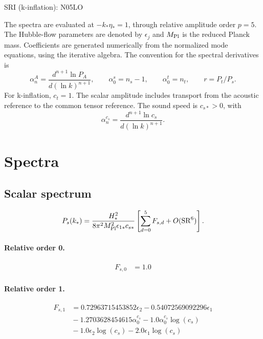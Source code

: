 \documentclass[10pt]{article}
\begin{document}
\begin{center}\Large SRI (k-inflation): N05LO\end{center}
The spectra are evaluated at $-k_*\eta_*=1$, through relative amplitude
order $p=5$. The Hubble-flow parameters are denoted by $\epsilon_j$
and $M_{\rm Pl}$ is the reduced Planck mass. Coefficients are generated
numerically from the normalized mode equations, using the iterative algebra.
The convention for the spectral derivatives is
\[
\alpha_n^A=\frac{d^{n+1}\ln P_A}{d(\ln k)^{n+1}},\qquad
\alpha_0^s=n_s-1,\qquad\alpha_0^t=n_t,\qquad r=P_t/P_s.
\]
For k-inflation, $c_t=1$. The scalar amplitude includes transport from the acoustic reference to the common tensor reference. The sound speed is $c_{s*}>0$, with
\[\alpha_n^{c_s}=\frac{d^{n+1}\ln c_s}{d(\ln k)^{n+1}}.\]
\section{Spectra}

\subsection{Scalar spectrum}
\[P_s(k_*)=\frac{H_*^2}{8\pi^2M_{\rm Pl}^2\epsilon_{1*}c_{s*}}\left[\sum_{d=0}^{5}F_{s,d}+O(\mathrm{SR}^{6})\right].\]
\paragraph{Relative order 0.}
\begin{align*}
F_{s,0} &= 1.0
\end{align*}

\paragraph{Relative order 1.}
\begin{align*}
F_{s,1} &= 0.72963715453852 \epsilon_{2} - 0.54072569092296 \epsilon_{1} \\
&{}  - 1.2703628454615 \alpha_{0}^{c_s} - 1.0 \alpha_{0}^{c_s} \log{\left(c_{s} \right)} \\
&{}  - 1.0 \epsilon_{2} \log{\left(c_{s} \right)} - 2.0 \epsilon_{1} \log{\left(c_{s} \right)}
\end{align*}
\end{document}
